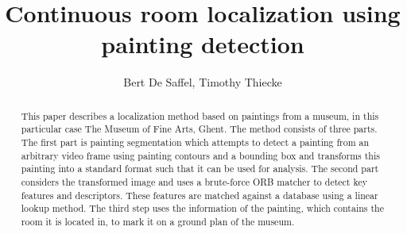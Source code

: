 \documentclass[10pt,final,journal]{IEEEtran}
\title{Continuous room localization using painting detection}
\author{Bert De Saffel, Timothy Thiecke}
\begin{document}
	\maketitle
	\begin{abstract}
		This paper describes a localization method based on paintings from a museum, in this particular case The Museum of Fine Arts, Ghent. The method consists of three parts. The first part is painting segmentation which attempts to detect a painting from an arbitrary video frame using painting contours and a bounding box and transforms this painting into a standard format such that it can be used for analysis. The second part considers the transformed image and uses a brute-force ORB \cite{Rublee2011} matcher to detect key features and descriptors. These features are matched against a database using a linear lookup method. The third step uses the information of the painting, which contains the room it is located in, to mark it on a ground plan of the museum.	
	\end{abstract}

	
	
	
	
	

	
	
\end{document}
